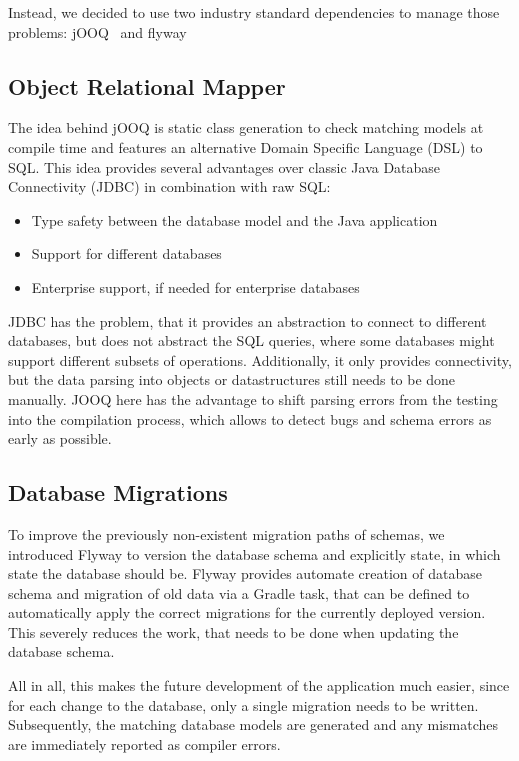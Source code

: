 Instead, we decided to use two industry standard dependencies to manage those problems: jOOQ~\cite{jooq} and
flyway~\cite{flyway}

\subsection*{Object Relational Mapper}
The idea behind jOOQ is static class generation to check matching models at compile time and features an alternative
Domain Specific Language (DSL) to SQL\@.
This idea provides several advantages over classic Java Database Connectivity (JDBC) in combination with raw SQL:
\begin{itemize}
\item Type safety between the database model and the Java application
\item Support for different databases
\item Enterprise support, if needed for enterprise databases
\end{itemize}

JDBC has the problem, that it provides an abstraction to connect to different databases, but does not abstract the
SQL queries, where some databases might support different subsets of operations.
Additionally, it only provides connectivity, but the data parsing into objects or datastructures still needs to be done
manually.
JOOQ here has the advantage to shift parsing errors from the testing into the compilation process, which allows to
detect bugs and schema errors as early as possible.

\subsection*{Database Migrations}
To improve the previously non-existent migration paths of schemas, we introduced Flyway to version the database schema
and explicitly state, in which state the database should be.
Flyway provides automate creation of database schema and migration of old data via a Gradle task, that can be defined to
automatically apply the correct migrations for the currently deployed version.
This severely reduces the work, that needs to be done when updating the database schema.

All in all, this makes the future development of the application much easier, since for each change to the database,
only a single migration needs to be written.
Subsequently, the matching database models are generated and any mismatches are immediately reported as compiler errors.

